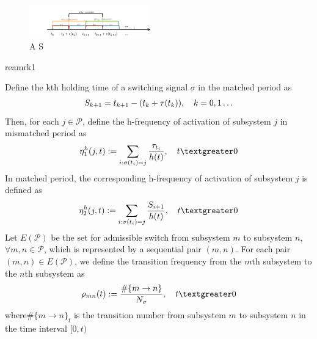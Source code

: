 \documentclass[twocolumn]{autart}    %
\begin{document}
\begin{figure}[htbp]
    \centering
    \includegraphics[width=0.47\textwidth,height=0.168\textwidth]{2_1.png}
    \caption{A S}
    \end{figure} 

\begin{rmk}
    reamrk1
\end{rmk}


\begin{defn}
    
    Define the kth holding time of a switching
    signal $\sigma$ in the matched period as
    \begin{equation}
        \begin{aligned}
            \setlength{\arraycolsep}{0.9pt}
            S_{k+1} = t_{k+1} - (t_{k}+\tau(t_{k})), \quad k = 0,1\ldots 
        \end{aligned}
    \end{equation}
    Then, for each $j \in \mathcal{P}$, define the h-frequency of activation of subsystem $j$ in mismatched period as
    \begin{equation}
        \begin{aligned}
            \setlength{\arraycolsep}{0.9pt}
            \eta^{h}_{1}(j,t) := \sum_{i:\sigma(t_{i}) = j}\frac{\tau_{t_{i}}}{h(t)}, \quad t\textgreater 0
        \end{aligned}
    \end{equation}
    In matched period, the corresponding h-frequency of activation of subsystem $j$ is defined as
    \begin{equation}
        \begin{aligned}
            \setlength{\arraycolsep}{0.9pt}
            \eta^{h}_{2}(j,t) := \sum_{i:\sigma(t_{i}) = j}\frac{S_{i+1}}{h(t)}, \quad t\textgreater 0
        \end{aligned}
    \end{equation}
    Let $E(\mathcal{P})$ be the set for admissible switch from subsystem $m$ to subsystem $n$, $\forall m, n \in \mathcal{P}$, which is represented by a
    sequential pair $(m,n)$. For each pair $(m,n) \in E(\mathcal{P})$, we define the transition frequency from the $m$th subsystem to the $n$th
    subsystem as
    \begin{equation}
        \begin{aligned}
            \setlength{\arraycolsep}{0.9pt}
            \rho_{mn}(t) := \frac{\# \{m \rightarrow n\}}{N_{\sigma}} , \quad t \textgreater 0
        \end{aligned}
    \end{equation}
    where$\# \{m\rightarrow n\}_{t}$ is the transition number from subsystem $m$ to subsystem $n$ in the time interval $[0,t)$
    

\end{defn}
\end{document}
